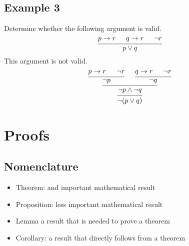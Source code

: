 \documentclass{article}
\theoremstyle{mytheoremstyle}
\theoremstyle{mytheoremstyle}
\theoremstyle{myproblemstyle}
\begin{document}
    \subsection*{Example 3}
    Determine whether the following argument is valid.
    \[
        \begin{prooftree}
            \hypo{p \rightarrow r}
            \hypo{q \rightarrow r}
            \hypo{\neg r}
            \infer3{p \vee q}
        \end{prooftree}
    \]
    This argument is not valid.
    \[
        \begin{prooftree}
            \hypo{p \rightarrow r}
            \hypo{\neg r}
            \infer2{\neg p}
            \hypo{q \rightarrow r}
            \hypo{\neg r}
            \infer2{\neg q}
            \infer2{\neg p \wedge \neg q}
            \infer1{\neg (p \vee q)}
        \end{prooftree}
    \]

    \section*{Proofs}
    \subsection*{Nomenclature}
    \begin{itemize}
        \item Theorem: and important mathematical result
        \item Proposition: less important mathematical result
        \item Lemma a result that is needed to prove a theorem
        \item Corollary: a result that directly follows from a theorem
    \end{itemize}
\end{document}
